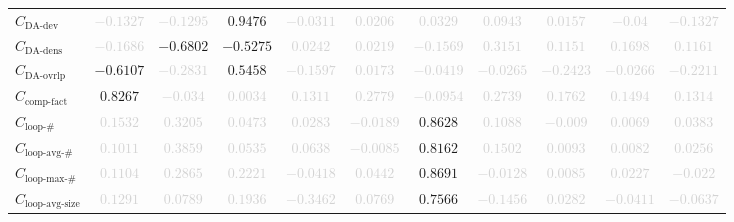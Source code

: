 \documentclass{standalone}
\newcommand{\dadevname}{\text{DA-dev}}
\newcommand{\dadev}{C_{\dadevname}}
\newcommand{\dadensname}{\text{DA-dens}}
\newcommand{\dadens}{C_{\dadensname}}
\newcommand{\daoverlapname}{\text{DA-ovrlp}}
\newcommand{\daoverlap}{C_{\daoverlapname}}
\newcommand{\complexityfactorname}{\text{comp-fact}}
\newcommand{\complexityfactor}{C_{\complexityfactorname}}
\newcommand{\loopnumname}{\text{loop-\#}}
\newcommand{\loopnum}{C_{\loopnumname}}
\newcommand{\loopavgname}{\text{loop-avg-\#}}
\newcommand{\loopavg}{C_{\loopavgname}}
\newcommand{\loopmaxname}{\text{loop-max-\#}}
\newcommand{\loopmax}{C_{\loopmaxname}}
\newcommand{\loopavgsizename}{\text{loop-avg-size}}
\newcommand{\loopavgsize}{C_{\loopavgsizename}}
\begin{document}
\begin{tabular}{lcccccccccc}
$\dadev$ & \textcolor{lightgray}{$-0.1327$} & \textcolor{lightgray}{$-0.1295$} & $0.9476$ & \textcolor{lightgray}{$-0.0311$} & \textcolor{lightgray}{$0.0206$} & \textcolor{lightgray}{$0.0329$} & \textcolor{lightgray}{$0.0943$} & \textcolor{lightgray}{$0.0157$} & \textcolor{lightgray}{$-0.04$} & \textcolor{lightgray}{$-0.1327$} \\ 
$\dadens$ & \textcolor{lightgray}{$-0.1686$} & $-0.6802$ & $-0.5275$ & \textcolor{lightgray}{$0.0242$} & \textcolor{lightgray}{$0.0219$} & \textcolor{lightgray}{$-0.1569$} & \textcolor{lightgray}{$0.3151$} & \textcolor{lightgray}{$0.1151$} & \textcolor{lightgray}{$0.1698$} & \textcolor{lightgray}{$0.1161$} \\ 
$\daoverlap$ & $-0.6107$ & \textcolor{lightgray}{$-0.2831$} & $0.5458$ & \textcolor{lightgray}{$-0.1597$} & \textcolor{lightgray}{$0.0173$} & \textcolor{lightgray}{$-0.0419$} & \textcolor{lightgray}{$-0.0265$} & \textcolor{lightgray}{$-0.2423$} & \textcolor{lightgray}{$-0.0266$} & \textcolor{lightgray}{$-0.2211$} \\ 
$\complexityfactor$ & $0.8267$ & \textcolor{lightgray}{$-0.034$} & \textcolor{lightgray}{$0.0034$} & \textcolor{lightgray}{$0.1311$} & \textcolor{lightgray}{$0.2779$} & \textcolor{lightgray}{$-0.0954$} & \textcolor{lightgray}{$0.2739$} & \textcolor{lightgray}{$0.1762$} & \textcolor{lightgray}{$0.1494$} & \textcolor{lightgray}{$0.1314$} \\ 
$\loopnum$ & \textcolor{lightgray}{$0.1532$} & \textcolor{lightgray}{$0.3205$} & \textcolor{lightgray}{$0.0473$} & \textcolor{lightgray}{$0.0283$} & \textcolor{lightgray}{$-0.0189$} & $0.8628$ & \textcolor{lightgray}{$0.1088$} & \textcolor{lightgray}{$-0.009$} & \textcolor{lightgray}{$0.0069$} & \textcolor{lightgray}{$0.0383$} \\ 
$\loopavg$ & \textcolor{lightgray}{$0.1011$} & \textcolor{lightgray}{$0.3859$} & \textcolor{lightgray}{$0.0535$} & \textcolor{lightgray}{$0.0638$} & \textcolor{lightgray}{$-0.0085$} & $0.8162$ & \textcolor{lightgray}{$0.1502$} & \textcolor{lightgray}{$0.0093$} & \textcolor{lightgray}{$0.0082$} & \textcolor{lightgray}{$0.0256$} \\ 
$\loopmax$ & \textcolor{lightgray}{$0.1104$} & \textcolor{lightgray}{$0.2865$} & \textcolor{lightgray}{$0.2221$} & \textcolor{lightgray}{$-0.0418$} & \textcolor{lightgray}{$0.0442$} & $0.8691$ & \textcolor{lightgray}{$-0.0128$} & \textcolor{lightgray}{$0.0085$} & \textcolor{lightgray}{$0.0227$} & \textcolor{lightgray}{$-0.022$} \\ 
$\loopavgsize$ & \textcolor{lightgray}{$0.1291$} & \textcolor{lightgray}{$0.0789$} & \textcolor{lightgray}{$0.1936$} & \textcolor{lightgray}{$-0.3462$} & \textcolor{lightgray}{$0.0769$} & $0.7566$ & \textcolor{lightgray}{$-0.1456$} & \textcolor{lightgray}{$0.0282$} & \textcolor{lightgray}{$-0.0411$} & \textcolor{lightgray}{$-0.0637$} \\ 

\end{tabular}
\end{document}
